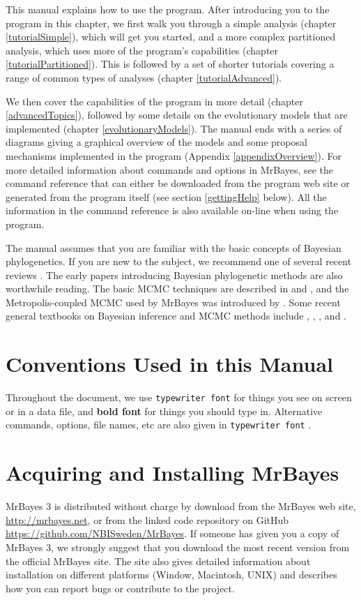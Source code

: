 \documentclass[12pt]{book}
\newcommand{\ttt}[1]{\texttt{#1} }
\begin{document}
This manual explains how to use the program. After introducing you to the program in this chapter,
we first walk you through a simple analysis (chapter \ref{tutorialSimple}), which will get you
started, and a more complex partitioned analysis, which uses more of the program's capabilities
(chapter \ref{tutorialPartitioned}). This is followed by a set of shorter tutorials covering a
range of common types of analyses (chapter \ref{tutorialAdvanced}). 

We then cover the capabilities of the program in more detail (chapter \ref{advancedTopics}),
followed by some details on the evolutionary models that are implemented (chapter
\ref{evolutionaryModels}). The manual ends with a series of diagrams giving a graphical overview of
the models and some proposal mechanisms implemented in the program (Appendix
\ref{appendixOverview}). For more detailed information about commands and options in MrBayes, see
the command reference that can either be downloaded from the program web site or generated from the
program itself (see section \ref{gettingHelp} below). All the information in the command reference
is also available on-line when using the program.

The manual assumes that you are familiar with the basic concepts of Bayesian phylogenetics. If you
are new to the subject, we recommend one of several recent reviews \citep{lewis01, holder03,
ronquist10}. The early papers introducing Bayesian phylogenetic methods \citep{li96, mau96,
rannala96, mau97, larget99, mau99, newton99} are also worthwhile reading. The basic MCMC techniques
are described in \citet{metropolis53} and \citet{hastings70}, and the Metropolis-coupled MCMC used
by MrBayes was introduced by \citet{geyer91}. Some recent general textbooks on Bayesian inference
and MCMC methods include \citet{gilks96a}, \citet{carlin00}, \citet{gelman03}, and
\citet{gamerman06}.


\section{Conventions Used in this Manual}
Throughout the document, we use \ttt{typewriter font} for things you see on screen or in a data
file, and \textbf{bold font} for things you should type in. Alternative commands, options, file
names, etc are also given in \ttt{typewriter font}.

\section{Acquiring and Installing MrBayes}
MrBayes 3 is distributed without charge by download from the MrBayes web site,
\url{http://mrbayes.net}, or from the linked code repository on GitHub
\url{https://github.com/NBISweden/MrBayes}.  If someone has given you a copy of MrBayes 3, we
strongly suggest that you download the most recent version from the official MrBayes site. The site
also gives detailed information about installation on different platforms (Window, Macintosh, UNIX)
and describes how you can report bugs or contribute to the project.
\end{document}
